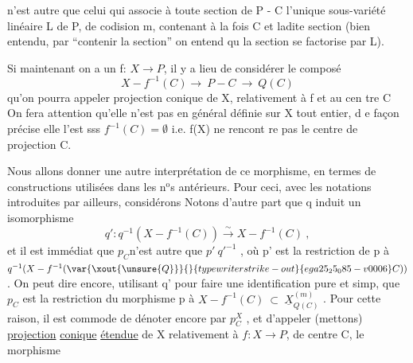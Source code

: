 
n'est autre que celui qui associe à toute section de  P - C  l'unique
sous-variété linéaire  L de P, de codision m, contenant à la fois C
et ladite section  (bien entendu, par ``contenir la section'' on entend qu
la section se factorise par L).

Si maintenant on a un f: $X \longrightarrow P$,  il y a lieu de considérer le
composé
\[ X - f^{-1}(C) \longrightarrow\ P - C \ \longrightarrow\ Q(C) \]
qu'on pourra appeler projection conique de X, relativement à f et au cen%
tre C\hand{,}  \hand{(}On fera attention qu'elle n'est pas en général définie sur X tout
entier, d e façon précise elle l'est sss $f^{-1}(C)=\emptyset$ i.e. f(X) ne rencont re
pas le centre de projection C. \hand{\unsure{)}}

Nous allons donner une autre interprétation de ce morphisme, en
termes de constructions utilisées dans les n$^{\text{o}}$s antérieurs.  Pour ceci,
avec les notations introduites par ailleurs, considérons
Notons d'autre part que  q  induit un  isomorphisme
\[ q':q^{-1}(X-f^{-1}(C)) \xrightarrow{\ \sim\ } X - f^{-1}(C) \ , \]
et il est immédiat que  $p_{C}$n'est autre  que   $p'\ q'^{-1}$ , où p' est la
restriction de  p à  $q^{-1}(X-f^{-1}(\var{\xout{\unsure{Q}}}{}{typewriter strike-out}{ega25_25_085-v0006}C))$.  On peut dire encore, utilisant q'
pour faire une identification pure et simp, que  $p_{C}$ est la restriction
du morphisme p  à  $X - f^{-1}(C) \ \subset\ \underline{X}^{(m)}_{Q(C)}$ . Pour cette raison, il est
commode de dénoter encore par  $p^{X}_{C}$ , et d'appeler  (mettons)  \uline{projection}
\uline{conique}  \uline{étendue}  de X\hand{,} relativement à $f:X\rightarrow P$, de centre C, le morphisme

